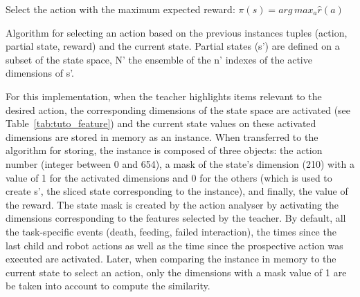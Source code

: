 \begin{algorithm}
	\DontPrintSemicolon
	Select the action with the maximum expected reward:
	$\pi(s) = arg\, max_{a} \hat{r}(a)$
	
	\caption{Algorithm for selecting an action based on the previous instances tuples (action, partial state, reward) and the current state. Partial states (s') are defined on a subset of the state space, N' the ensemble of the n' indexes of the active dimensions of s'.}
	\label{algo:tuto_select}
\end{algorithm}

For this implementation, when the teacher highlights items relevant to the desired action, the corresponding dimensions of the state space are activated (see Table~\ref{tab:tuto_feature}) and the current state values on these activated dimensions are stored in memory as an instance. %
When transferred to the algorithm for storing, the instance is composed of three objects: the action number (integer between 0 and 654), a mask of the state's dimension (210) with a value of 1 for the activated dimensions and 0 for the others (which is used to create s', the sliced state corresponding to the instance), and finally, the value of the reward. The state mask is created by the action analyser by activating the dimensions corresponding to the features selected by the teacher. By default, all the task-specific events (death, feeding, failed interaction), the times since the last child and robot actions as well as the time since the prospective action was executed are activated. Later, when comparing the instance in memory to the current state to select an action, only the dimensions with a mask value of 1 are be taken into account to compute the similarity.

